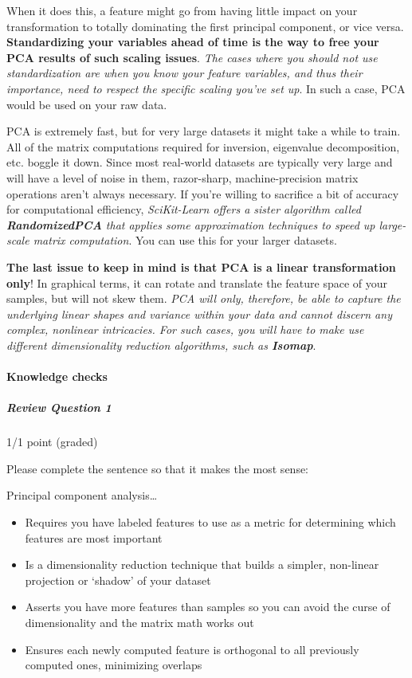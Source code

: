 \documentclass[11pt]{article}
\providecommand{\tightlist}{%
      \setlength{\itemsep}{0pt}\setlength{\parskip}{0pt}}
\begin{document}
When it does this, a feature might go from having little impact on your
transformation to totally dominating the first principal component, or
vice versa. \textbf{Standardizing your variables ahead of time is the
way to free your PCA results of such scaling issues}. \emph{The cases
where you should not use standardization are when you know your feature
variables, and thus their importance, need to respect the specific
scaling you've set up}. In such a case, PCA would be used on your raw
data.

PCA is extremely fast, but for very large datasets it might take a while
to train. All of the matrix computations required for inversion,
eigenvalue decomposition, etc. boggle it down. Since most real-world
datasets are typically very large and will have a level of noise in
them, razor-sharp, machine-precision matrix operations aren't always
necessary. If you're willing to sacrifice a bit of accuracy for
computational efficiency, \emph{SciKit-Learn offers a sister algorithm
called \textbf{RandomizedPCA} that applies some approximation techniques
to speed up large-scale matrix computation}. You can use this for your
larger datasets.

\textbf{The last issue to keep in mind is that PCA is a linear
transformation only}! In graphical terms, it can rotate and translate
the feature space of your samples, but will not skew them. \emph{PCA
will only, therefore, be able to capture the underlying linear shapes
and variance within your data and cannot discern any complex, nonlinear
intricacies. For such cases, you will have to make use different
dimensionality reduction algorithms, such as \textbf{Isomap}}.

\paragraph{Knowledge checks}\label{knowledge-checks}

\subparagraph{Review Question 1}\label{review-question-1}

1/1 point (graded)

Please complete the sentence so that it makes the most sense:

Principal component analysis\ldots{}

\begin{itemize}
\tightlist
\item
  Requires you have labeled features to use as a metric for determining
  which features are most important
\item
  Is a dimensionality reduction technique that builds a simpler,
  non-linear projection or `shadow' of your dataset
\item
  Asserts you have more features than samples so you can avoid the curse
  of dimensionality and the matrix math works out
\item
  Ensures each newly computed feature is orthogonal to all previously
  computed ones, minimizing overlaps
\end{itemize}
\end{document}
